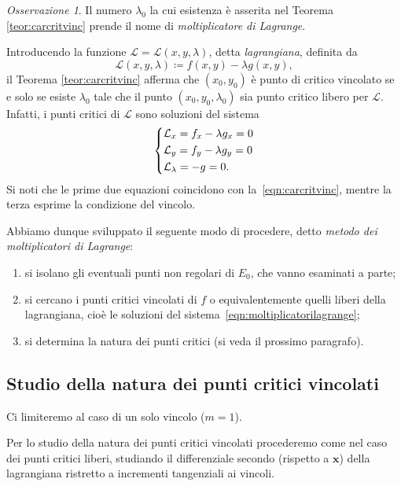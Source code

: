 \documentclass[a4paper]{book}
\numberwithin{equation}{section}
\theoremstyle{plain}
\theoremstyle{definition}
\theoremstyle{remark}
\newtheorem{oss}{Osservazione}[section]
\renewcommand{\vec}{\boldsymbol}
\theoremstyle{example}
\begin{document}
	\begin{oss}
		Il numero $\lambda_0$ la cui esistenza è asserita nel Teorema \ref{teor:carcritvinc} prende il nome di \emph{moltiplicatore di Lagrange}.

		Introducendo la funzione $\mathcal{L} = \mathcal{L}(x, y, \lambda)$, detta \emph{lagrangiana}, definita da
		\begin{equation*}
			\mathcal{L}(x, y, \lambda) \coloneqq f(x,y) - \lambda g(x,y),
		\end{equation*}
		il Teorema \ref{teor:carcritvinc} afferma che $(x_0, y_0)$ è punto di critico vincolato se e solo se esiste $\lambda_0$ tale che il punto $(x_0, y_0, \lambda_0)$ sia punto critico libero per $\mathcal{L}$. Infatti, i punti critici di $\mathcal{L}$ sono soluzioni del sistema
		\begin{equation}
			\label{eqn:moltiplicatorilagrange}
			\begin{dcases}
				\mathcal{L}_x = f_x - \lambda g_x = 0 \\
				\mathcal{L}_y = f_y - \lambda g_y = 0 \\
				\mathcal{L}_{\lambda} = -g = 0.
			\end{dcases}
		\end{equation}
		Si noti che le prime due equazioni coincidono con la~\eqref{eqn:carcritvinc}, mentre la terza esprime la condizione del vincolo.
	\end{oss}

	Abbiamo dunque sviluppato il seguente modo di procedere, detto \emph{metodo dei moltiplicatori di Lagrange}:
	\begin{enumerate}
		\item si isolano gli eventuali punti non regolari di $E_0$, che vanno esaminati a parte;
		\item si cercano i punti critici vincolati di $f$ o equivalentemente quelli liberi della lagrangiana, cioè le soluzioni del sistema~\eqref{eqn:moltiplicatorilagrange};
		\item si determina la natura dei punti critici (si veda il prossimo paragrafo).
	\end{enumerate}

	\subsection{Studio della natura dei punti critici vincolati}
	Ci limiteremo al caso di un solo vincolo ($m = 1$).

	Per lo studio della natura dei punti critici vincolati procederemo come nel caso dei punti critici liberi, studiando il differenziale secondo (rispetto a $\vec{x}$) della lagrangiana ristretto a incrementi tangenziali ai vincoli.
\end{document}
